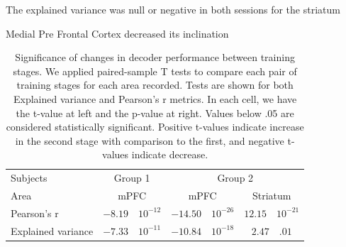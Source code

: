 The explained variance was null or negative in both sessions for the striatum

Medial Pre Frontal Cortex decreased its inclination


\begin{table}[ht]
    \centering
    \begin{tabular}{l|c|c|c}
        \hline
        Subjects & \multicolumn{1}{1}{Group 1} & \multicolumn{2}{1}{Group 2}\\
        Area & mPFC & mPFC & Striatum \\
        \hline
        Pearson's r         & $-8.19 \quad 10^{-12}$ 
                            & $-14.50 \quad 10^{-26}$ 
                            & $12.15 \quad 10^{-21}$ \\
        Explained variance  & $-7.33 \quad 10^{-11}$ 
                            & $-10.84 \quad 10^{-18}$ 
                            & $2.47 \quad .01$\\
        \hline
    \end{tabular}
    \caption[Significance of changes in decoder performance between training stages]{Significance of changes in decoder performance between training stages. We applied paired-sample T tests to compare each pair of training stages for each area recorded. Tests are shown for both Explained variance and Pearson's r metrics. In each cell, we have the t-value at left and the p-value at right. Values below .05 are considered statistically significant. Positive t-values indicate increase in the second stage with comparison to the first, and negative t-values indicate decrease.}
    \label{tab:statistics_learning_stage}
\end{table}

